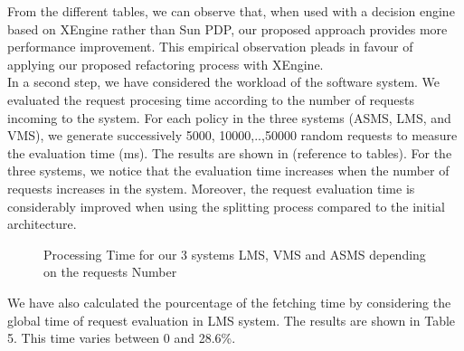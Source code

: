 From the different tables, we can observe that, when used with a decision engine based on XEngine rather than Sun PDP, our proposed approach provides more performance improvement. 
This empirical observation pleads in favour of applying our proposed refactoring process with XEngine.\\

In a second step, we have considered the workload of the software system. We evaluated the request procesing time according to the number of requests incoming to the system. 
For each policy in the three systems (ASMS, LMS, and VMS), we generate successively 5000, 10000,..,50000 random requests to measure the evaluation time (ms).
The results are shown in (reference to tables). For the three systems, we notice that the evaluation time increases when the number of requests increases in the system. 
Moreover, the request evaluation time is considerably improved when using the splitting process compared to the initial architecture.

\begin{figure}
  \centering
  \caption{Processing Time for our 3 systems LMS, VMS and ASMS depending on the requests Number}
  \label{fig:processing time}
\end{figure}
We have also calculated the pourcentage of the fetching time by considering the global time of request evaluation in LMS system.
The results are shown in Table 5. This time varies between 0 and 28.6\%.

